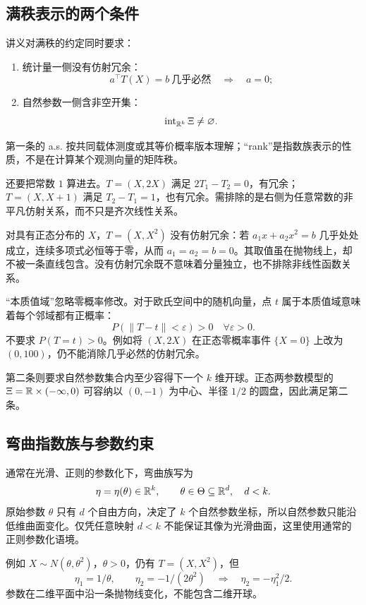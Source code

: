 \subsection{满秩表示的两个条件}
讲义对满秩的约定同时要求：
\begin{enumerate}
\item 统计量一侧没有仿射冗余：
\[
 a^\top T(X)=b\ \text{几乎必然}\quad\Longrightarrow\quad a=0;
\]
\item 自然参数一侧含非空开集：
\[
 \operatorname{int}_{\mathbb R^k}\Xi\ne\varnothing.
\]
\end{enumerate}
第一条的 a.s. 按共同载体测度或其等价概率版本理解；“rank”是指数族表示的性质，不是在计算某个观测向量的矩阵秩。

\begin{notebox}[追问：是不是统计量各分量线性无关？]
还要把常数 $1$ 算进去。$T=(X,2X)$ 满足 $2T_1-T_2=0$，有冗余；$T=(X,X+1)$ 满足 $T_2-T_1=1$，也有冗余。需排除的是右侧为任意常数的非平凡仿射关系，而不只是齐次线性关系。

对具有正态分布的 $X$，$T=(X,X^2)$ 没有仿射冗余：若 $a_1x+a_2x^2=b$ 几乎处处成立，连续多项式必恒等于零，从而 $a_1=a_2=b=0$。其取值虽在抛物线上，却不被一条直线包含。没有仿射冗余既不意味着分量独立，也不排除非线性函数关系。
\end{notebox}

“本质值域”忽略零概率修改。对于欧氏空间中的随机向量，点 $t$ 属于本质值域意味着每个邻域都有正概率：
\[
 P(\|T-t\|<\varepsilon)>0\quad\forall\varepsilon>0.
\]
不要求 $P(T=t)>0$。例如将 $(X,2X)$ 在正态零概率事件 $\{X=0\}$ 上改为 $(0,100)$，仍不能消除几乎必然的仿射冗余。

第二条则要求自然参数集合内至少容得下一个 $k$ 维开球。正态两参数模型的 $\Xi=\mathbb R\times(-\infty,0)$ 可容纳以 $(0,-1)$ 为中心、半径 $1/2$ 的圆盘，因此满足第二条。

\subsection{弯曲指数族与参数约束}
通常在光滑、正则的参数化下，弯曲族写为
\[
 \eta=\eta(\theta)\in\mathbb R^k,\qquad \theta\in\Theta\subseteq\mathbb R^d,\quad d<k.
\]
原始参数 $\theta$ 只有 $d$ 个自由方向，决定了 $k$ 个自然参数坐标，所以自然参数只能沿低维曲面变化。仅凭任意映射 $d<k$ 不能保证其像为光滑曲面，这里使用通常的正则参数化语境。

例如 $X\sim N(\theta,\theta^2)$，$\theta>0$，仍有 $T=(X,X^2)$，但
\[
 \eta_1=1/\theta,\qquad\eta_2=-1/(2\theta^2)
 \quad\Longrightarrow\quad \eta_2=-\eta_1^2/2.
\]
参数在二维平面中沿一条抛物线变化，不能包含二维开球。

